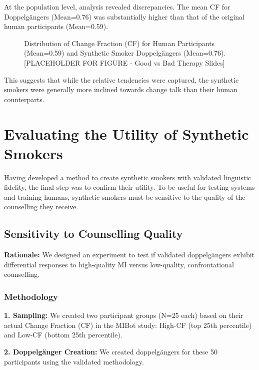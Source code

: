 At the population level, analysis revealed discrepancies. The mean CF for Doppelgängers (Mean=0.76) was substantially higher than that of the original human participants (Mean=0.59).

\begin{figure}[ht]
    \centering
    \caption{Distribution of Change Fraction (CF) for Human Participants (Mean=0.59) and Synthetic Smoker Doppelgängers (Mean=0.76). [PLACEHOLDER FOR FIGURE - Good vs Bad Therapy Slides]}
    \label{fig:cf-distribution}
\end{figure}

This suggests that while the relative tendencies were captured, the synthetic smokers were generally more inclined towards change talk than their human counterparts.

\section{Evaluating the Utility of Synthetic Smokers}
\label{sec:synthetic-smoker-utility}

Having developed a method to create synthetic smokers with validated linguistic fidelity, the final step was to confirm their utility. To be useful for testing systems and training humans, synthetic smokers must be sensitive to the quality of the counselling they receive.

\subsection{Sensitivity to Counselling Quality}

\textbf{Rationale:} We designed an experiment to test if validated doppelgängers exhibit differential responses to high-quality MI versus low-quality, confrontational counselling.

\subsubsection{Methodology}

\textbf{1. Sampling:} We created two participant groups (N=25 each) based on their actual Change Fraction (CF) in the MIBot study: High-CF (top 25th percentile) and Low-CF (bottom 25th percentile).

\textbf{2. Doppelgänger Creation:} We created doppelgängers for these 50 participants using the validated methodology.

